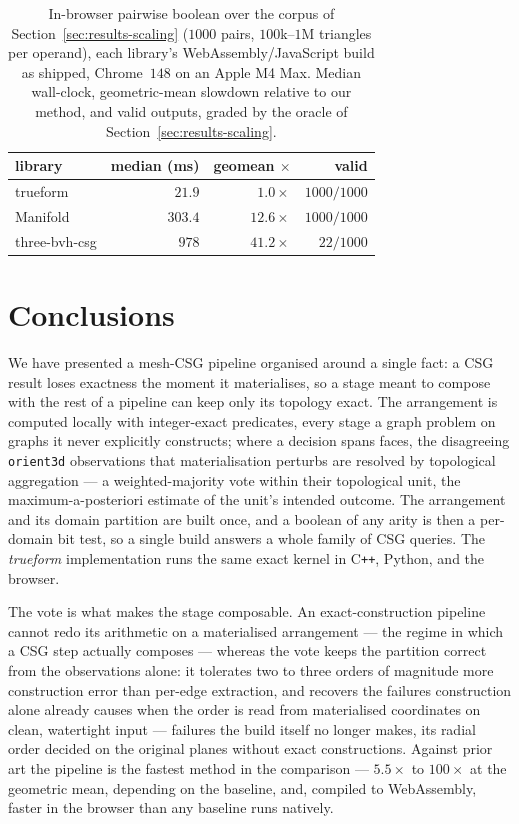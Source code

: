 \documentclass{egpubl}
\begin{document}
\begin{table}[t]
\centering
\caption{In-browser pairwise boolean over the corpus of Section~\ref{sec:results-scaling} ($1000$ pairs, $100$k--$1$M triangles per operand), each library's WebAssembly/JavaScript build as shipped, Chrome~$148$ on an Apple M4 Max. Median wall-clock, geometric-mean slowdown relative to our method, and valid outputs, graded by the oracle of Section~\ref{sec:results-scaling}.}
\label{tab:browser}
\small
\begin{tabular*}{\columnwidth}{@{\extracolsep{\fill}}lrrr@{}}
\toprule
library & median (ms) & geomean $\times$ & valid \\
\midrule
trueform      & $21.9$  & $1.0\times$   & $1000/1000$ \\
Manifold      & $303.4$ & $12.6\times$  & $1000/1000$ \\
three-bvh-csg & $978$   & $41.2\times$  & $22/1000$   \\
\bottomrule
\end{tabular*}
\end{table}

\section{Conclusions}
\label{sec:conclusions}

We have presented a mesh-CSG pipeline organised around a single fact: a CSG result loses exactness the moment it materialises, so a stage meant to compose with the rest of a pipeline can keep only its topology exact. The arrangement is computed locally with integer-exact predicates, every stage a graph problem on graphs it never explicitly constructs; where a decision spans faces, the disagreeing \texttt{orient3d} observations that materialisation perturbs are resolved by topological aggregation --- a weighted-majority vote within their topological unit, the maximum-a-posteriori estimate of the unit's intended outcome. The arrangement and its domain partition are built once, and a boolean of any arity is then a per-domain bit test, so a single build answers a whole family of CSG queries. The \emph{trueform} implementation runs the same exact kernel in C\texttt{++}, Python, and the browser.

The vote is what makes the stage composable. An exact-construction pipeline cannot redo its arithmetic on a materialised arrangement --- the regime in which a CSG step actually composes --- whereas the vote keeps the partition correct from the observations alone: it tolerates two to three orders of magnitude more construction error than per-edge extraction, and recovers the failures construction alone already causes when the order is read from materialised coordinates on clean, watertight input --- failures the build itself no longer makes, its radial order decided on the original planes without exact constructions. Against prior art the pipeline is the fastest method in the comparison --- $5.5\times$ to $100\times$ at the geometric mean, depending on the baseline, and, compiled to WebAssembly, faster in the browser than any baseline runs natively.
\end{document}
